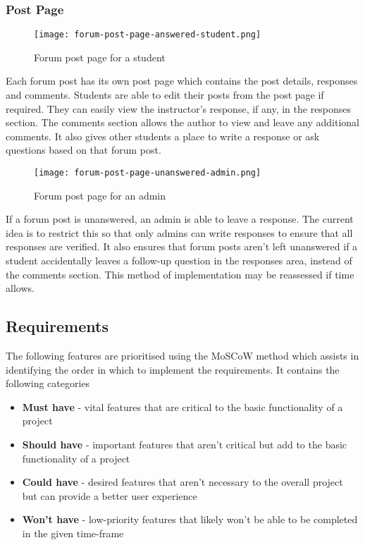 \subsubsection{Post Page}

\begin{figure}[h!]
    \texttt{[image: forum-post-page-answered-student.png]}
    \centering
    \caption{Forum post page for a student}
\end{figure}

Each forum post has its own post page which contains the post details, responses and comments.
Students are able to edit their posts from the post page if required.
They can easily view the instructor's response, if any, in the responses section.
The comments section allows the author to view and leave any additional comments.
It also gives other students a place to write a response or ask questions based on that forum post.

\begin{figure}[h!]
    \texttt{[image: forum-post-page-unanswered-admin.png]}
    \centering
    \caption{Forum post page for an admin}
\end{figure}

If a forum post is unanswered, an admin is able to leave a response.
The current idea is to restrict this so that only admins can write responses to ensure that all responses are verified.
It also ensures that forum posts aren't left unanswered if a student accidentally leaves a follow-up question in the responses area, instead of the comments section.
This method of implementation may be reassessed if time allows.

\subsection{Requirements}
The following features are prioritised using the MoSCoW method which assists in identifying the order in which to implement the requirements.
It contains the following categories

\begin{itemize}
    \item \textbf{Must have} - vital features that are critical to the basic functionality of a project
    \item \textbf{Should have} - important features that aren't critical but add to the basic functionality of a project
    \item \textbf{Could have} - desired features that aren't necessary to the overall project but can provide a better user experience
    \item \textbf{Won't have} - low-priority features that likely won't be able to be completed in the given time-frame
\end{itemize}

